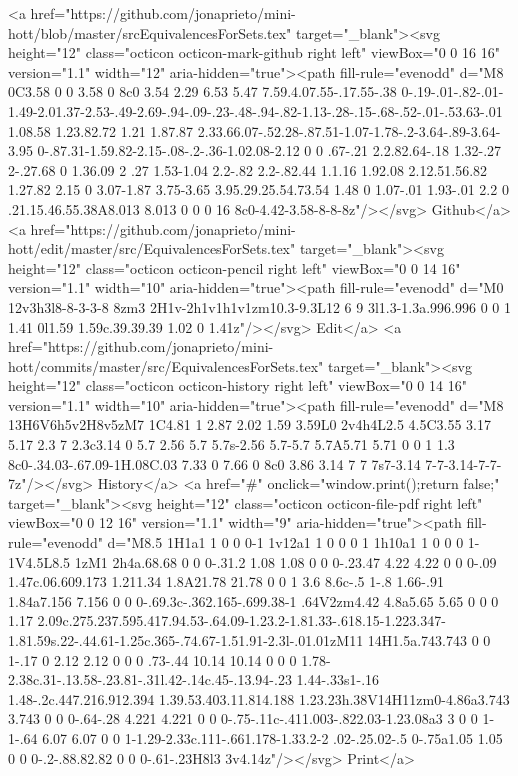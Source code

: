       <a href="https://github.com/jonaprieto/mini-hott/blob/master/srcEquivalencesForSets.tex" target="_blank"><svg height="12" class="octicon octicon-mark-github right left" viewBox="0 0 16 16" version="1.1" width="12" aria-hidden="true"><path fill-rule="evenodd" d="M8 0C3.58 0 0 3.58 0 8c0 3.54 2.29 6.53 5.47 7.59.4.07.55-.17.55-.38 0-.19-.01-.82-.01-1.49-2.01.37-2.53-.49-2.69-.94-.09-.23-.48-.94-.82-1.13-.28-.15-.68-.52-.01-.53.63-.01 1.08.58 1.23.82.72 1.21 1.87.87 2.33.66.07-.52.28-.87.51-1.07-1.78-.2-3.64-.89-3.64-3.95 0-.87.31-1.59.82-2.15-.08-.2-.36-1.02.08-2.12 0 0 .67-.21 2.2.82.64-.18 1.32-.27 2-.27.68 0 1.36.09 2 .27 1.53-1.04 2.2-.82 2.2-.82.44 1.1.16 1.92.08 2.12.51.56.82 1.27.82 2.15 0 3.07-1.87 3.75-3.65 3.95.29.25.54.73.54 1.48 0 1.07-.01 1.93-.01 2.2 0 .21.15.46.55.38A8.013 8.013 0 0 0 16 8c0-4.42-3.58-8-8-8z"/></svg> Github</a>
      <a href="https://github.com/jonaprieto/mini-hott/edit/master/src/EquivalencesForSets.tex" target="_blank"><svg height="12" class="octicon octicon-pencil right left" viewBox="0 0 14 16" version="1.1" width="10" aria-hidden="true"><path fill-rule="evenodd" d="M0 12v3h3l8-8-3-3-8 8zm3 2H1v-2h1v1h1v1zm10.3-9.3L12 6 9 3l1.3-1.3a.996.996 0 0 1 1.41 0l1.59 1.59c.39.39.39 1.02 0 1.41z"/></svg> Edit</a>
      <a href="https://github.com/jonaprieto/mini-hott/commits/master/src/EquivalencesForSets.tex" target="_blank"><svg height="12" class="octicon octicon-history right left" viewBox="0 0 14 16" version="1.1" width="10" aria-hidden="true"><path fill-rule="evenodd" d="M8 13H6V6h5v2H8v5zM7 1C4.81 1 2.87 2.02 1.59 3.59L0 2v4h4L2.5 4.5C3.55 3.17 5.17 2.3 7 2.3c3.14 0 5.7 2.56 5.7 5.7s-2.56 5.7-5.7 5.7A5.71 5.71 0 0 1 1.3 8c0-.34.03-.67.09-1H.08C.03 7.33 0 7.66 0 8c0 3.86 3.14 7 7 7s7-3.14 7-7-3.14-7-7-7z"/></svg> History</a>
      <a  href="#" onclick="window.print();return false;" target="_blank"><svg height="12" class="octicon octicon-file-pdf right left" viewBox="0 0 12 16" version="1.1" width="9" aria-hidden="true"><path fill-rule="evenodd" d="M8.5 1H1a1 1 0 0 0-1 1v12a1 1 0 0 0 1 1h10a1 1 0 0 0 1-1V4.5L8.5 1zM1 2h4a.68.68 0 0 0-.31.2 1.08 1.08 0 0 0-.23.47 4.22 4.22 0 0 0-.09 1.47c.06.609.173 1.211.34 1.8A21.78 21.78 0 0 1 3.6 8.6c-.5 1-.8 1.66-.91 1.84a7.156 7.156 0 0 0-.69.3c-.362.165-.699.38-1 .64V2zm4.42 4.8a5.65 5.65 0 0 0 1.17 2.09c.275.237.595.417.94.53-.64.09-1.23.2-1.81.33-.618.15-1.223.347-1.81.59s.22-.44.61-1.25c.365-.74.67-1.51.91-2.3l-.01.01zM11 14H1.5a.743.743 0 0 1-.17 0 2.12 2.12 0 0 0 .73-.44 10.14 10.14 0 0 0 1.78-2.38c.31-.13.58-.23.81-.31l.42-.14c.45-.13.94-.23 1.44-.33s1-.16 1.48-.2c.447.216.912.394 1.39.53.403.11.814.188 1.23.23h.38V14H11zm0-4.86a3.743 3.743 0 0 0-.64-.28 4.221 4.221 0 0 0-.75-.11c-.411.003-.822.03-1.23.08a3 3 0 0 1-1-.64 6.07 6.07 0 0 1-1.29-2.33c.111-.661.178-1.33.2-2 .02-.25.02-.5 0-.75a1.05 1.05 0 0 0-.2-.88.82.82 0 0 0-.61-.23H8l3 3v4.14z"/></svg> Print</a>
